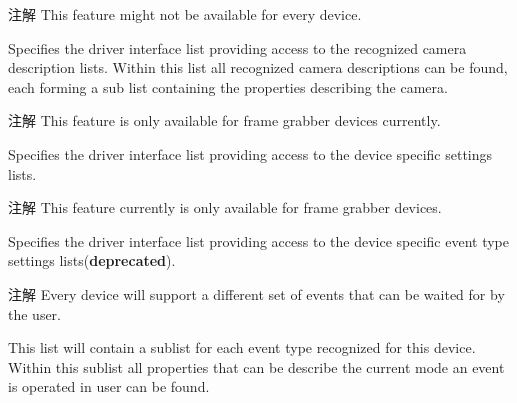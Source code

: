 \begin{Desc}
\begin{description}
\begin{DoxyNote}{注解}
This feature might not be available for every device. 
\end{DoxyNote}
\item[{\em 
\hypertarget{group___common_interface_gga0dca79bbf0803a4ecec16d6cbb1a3dbba7f951ed8a459077337d46a767bb58109}{dlt\+Camera\+Descriptions}\label{group___common_interface_gga0dca79bbf0803a4ecec16d6cbb1a3dbba7f951ed8a459077337d46a767bb58109}
}]Specifies the driver interface list providing access to the recognized camera description lists. Within this list all recognized camera descriptions can be found, each forming a sub list containing the properties describing the camera.

\begin{DoxyNote}{注解}
This feature is only available for frame grabber devices currently. 
\end{DoxyNote}
\item[{\em 
\hypertarget{group___common_interface_gga0dca79bbf0803a4ecec16d6cbb1a3dbba8e80d398e934f803d879e39132375be9}{dlt\+Device\+Specific\+Data}\label{group___common_interface_gga0dca79bbf0803a4ecec16d6cbb1a3dbba8e80d398e934f803d879e39132375be9}
}]Specifies the driver interface list providing access to the device specific settings lists. \begin{DoxyNote}{注解}
This feature currently is only available for frame grabber devices. 
\end{DoxyNote}
\item[{\em 
\hypertarget{group___common_interface_gga0dca79bbf0803a4ecec16d6cbb1a3dbbadfcd0c73c98d71804d38235e8139dad8}{dlt\+Event\+Sub\+System\+Settings}\label{group___common_interface_gga0dca79bbf0803a4ecec16d6cbb1a3dbbadfcd0c73c98d71804d38235e8139dad8}
}]Specifies the driver interface list providing access to the device specific event type settings lists({\bfseries deprecated}). \begin{DoxyNote}{注解}
Every device will support a different set of events that can be waited for by the user.
\end{DoxyNote}
This list will contain a sublist for each event type recognized for this device. Within this sublist all properties that can be describe the current mode an event is operated in user can be found.


\end{description}
\end{Desc}
